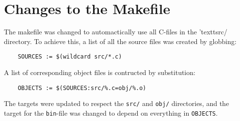 \section{Changes to the Makefile}
The makefile was changed to automactically use all C-files in the 'textt{src/} directory.
To achieve this, a list of all the source files was created by globbing:

\begin{verbatim}
    SOURCES := $(wildcard src/*.c)
\end{verbatim}

A list of corresponding object files is contructed by substitution:
\begin{verbatim}
    OBJECTS := $(SOURCES:src/%.c=obj/%.o)
\end{verbatim}

The targets were updated to respect the \texttt{src/} and \texttt{obj/} directories, and the target for the \texttt{bin}-file was changed to depend on everything in \texttt{OBJECTS}.
